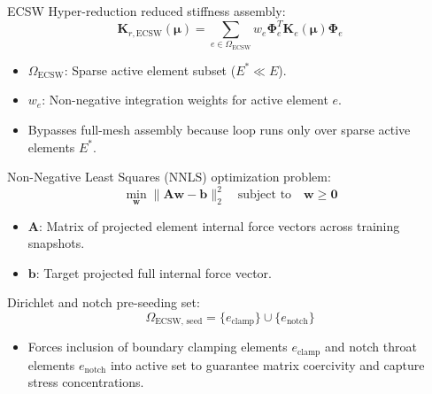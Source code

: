 \documentclass[12pt,a4paper,oneside]{report}
\newcommand{\vect}[1]{\mathbf{#1}}
\newcommand{\mat}[1]{\mathbf{#1}}
\begin{document}
ECSW Hyper-reduction reduced stiffness assembly:
\begin{equation}
    \mathbf{K}_{r, \text{ECSW}}(\boldsymbol{\mu}) = \sum_{e \in \Omega_{\text{ECSW}}} w_e \boldsymbol{\Phi}_e^T \mathbf{K}_{e}(\boldsymbol{\mu}) \boldsymbol{\Phi}_e
\end{equation}
\begin{tcolorbox}[colback=gray!5!white,colframe=gray!60!black,title={Term Definitions \& Parameter Dependencies}]
\begin{itemize}
    \item $\Omega_{\text{ECSW}}$: Sparse active element subset ($E^* \ll E$).
    \item $w_e$: Non-negative integration weights for active element $e$.
    \item Bypasses full-mesh assembly because loop runs only over sparse active elements $E^*$.
\end{itemize}
\end{tcolorbox}

Non-Negative Least Squares (NNLS) optimization problem:
\begin{equation}
    \min_{\vect{w}} \|\mat{A}\vect{w} - \vect{b}\|_2^2 \quad \text{subject to} \quad \vect{w} \ge \vect{0}
\end{equation}
\begin{tcolorbox}[colback=gray!5!white,colframe=gray!60!black,title={Term Definitions \& Parameter Dependencies}]
\begin{itemize}
    \item $\mat{A}$: Matrix of projected element internal force vectors across training snapshots.
    \item $\vect{b}$: Target projected full internal force vector.
\end{itemize}
\end{tcolorbox}

Dirichlet and notch pre-seeding set:
\begin{equation}
    \Omega_{\text{ECSW, seed}} = \{e_{\text{clamp}}\} \cup \{e_{\text{notch}}\}
\end{equation}
\begin{tcolorbox}[colback=gray!5!white,colframe=gray!60!black,title={Term Definitions \& Parameter Dependencies}]
\begin{itemize}
    \item Forces inclusion of boundary clamping elements $e_{\text{clamp}}$ and notch throat elements $e_{\text{notch}}$ into active set to guarantee matrix coercivity and capture stress concentrations.
\end{itemize}
\end{tcolorbox}
\end{document}
